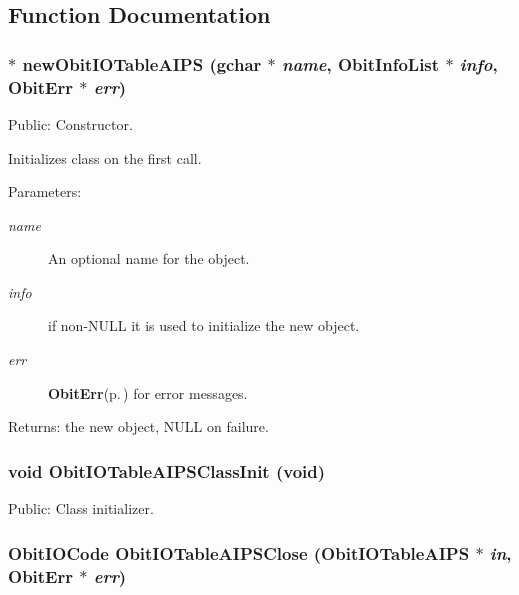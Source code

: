 \subsection{Function Documentation}
\subsubsection{$\ast$ new\-Obit\-IOTable\-AIPS (gchar $\ast$ {\em name}, {\bf Obit\-Info\-List} $\ast$ {\em info}, {\bf Obit\-Err} $\ast$ {\em err})}\label{ObitIOTableAIPS_8h_a4}


Public: Constructor. 

Initializes class on the first call. \begin{Desc}
\item[Parameters:]
\begin{description}
\item[{\em name}]An optional name for the object. \item[{\em info}]if non-NULL it is used to initialize the new object. \item[{\em err}]{\bf Obit\-Err}{\rm (p.\,\pageref{structObitErr})} for error messages. \end{description}
\end{Desc}
\begin{Desc}
\item[Returns:]the new object, NULL on failure. \end{Desc}
\subsubsection{\setlength{\rightskip}{0pt plus 5cm}void Obit\-IOTable\-AIPSClass\-Init (void)}\label{ObitIOTableAIPS_8h_a3}


Public: Class initializer. 

\subsubsection{\setlength{\rightskip}{0pt plus 5cm}Obit\-IOCode Obit\-IOTable\-AIPSClose ({\bf Obit\-IOTable\-AIPS} $\ast$ {\em in}, {\bf Obit\-Err} $\ast$ {\em err})}\label{ObitIOTableAIPS_8h_a10}


